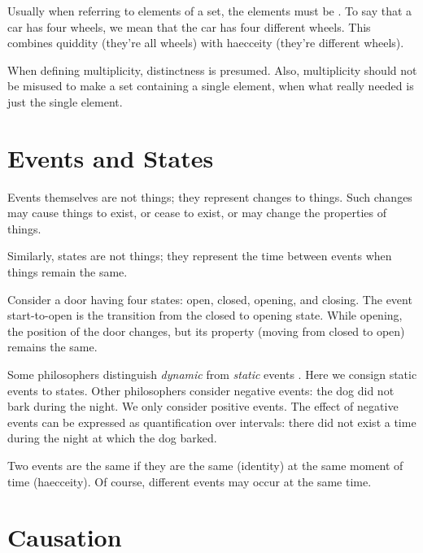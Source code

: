 
\pn Usually when referring to elements of a set, the elements must be .  To say that a car has four wheels, we mean that the car has four different wheels.  This combines quiddity (they're all wheels) with haecceity (they're different wheels).

\pn When defining multiplicity, distinctness is presumed.  Also, multiplicity should not be misused to make a set containing a single element, when what really needed is just the single element.


\section{Events and States}\label{sec:events}

\pn Events themselves are not things; they represent changes to things.  Such changes may cause things to exist, or cease to exist, or may change the properties of things.


\pn Similarly, states are not things; they represent the time between events when things remain the same.


\pn Consider a door having four states:  open, closed, opening, and closing.  The event start-to-open is the transition from the closed to opening state.  While opening, the position of the door changes, but its property (moving from closed to open) remains the same.

\pn Some philosophers distinguish \emph{dynamic} from \emph{static} events \cite{sep-events}.  Here we consign static events to states.
Other philosophers consider negative events:  the dog did not bark during the night.  We only consider positive events.  The effect of negative events can be expressed as quantification over intervals:  there did not exist a time during the night at which the dog barked.

\pn Two events are the same if they are the same (identity) at the same moment of time (haecceity).  Of course, different events may occur at the same time.

\section{Causation}\label{sec:causation}

